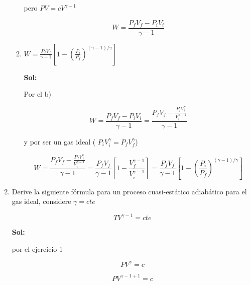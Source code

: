 \documentclass[12pt,a4paper]{article}
\begin{document}
\begin{enumerate}
\begin{enumerate}
        pero $PV = c V^{\gamma - 1}$
        
        \begin{equation*}
            W =  \frac{P_{f} V_{f} - P_{i}V_{i}}{\gamma - 1}
        \end{equation*}
        
        
        \item $W = \frac{P_f V_f}{\gamma - 1}\left[1 - \left(\frac{P_i}{P_f}\right)^{(\gamma - 1)/\gamma}\right]$
        
        \textbf{Sol:}
        
        Por el b)
        
        \begin{equation*}
            W =  \frac{P_{f} V_{f} - P_{i}V_{i}}{\gamma - 1} = \frac{P_{f} V_{f} - \frac{P_{i}V_{i}^{\gamma}}{V_{i}^{\gamma - 1}}}{\gamma - 1} 
        \end{equation*}
        
        y por ser un gas ideal ( $P_i V_{i}^{\gamma} = P_{f} V_{f}^{\gamma}$)
        
        \begin{equation*}
            W =\frac{P_{f} V_{f} - \frac{P_{f}V_{f}^{\gamma}}{V_{i}^{\gamma - 1}}}{\gamma - 1} = \frac{P_f V_f}{\gamma - 1} \left[ 1 - \frac{V_{f}^{\gamma - 1}}{V_{i}^{\gamma - 1}}\right] = \frac{P_f V_f}{\gamma - 1}\left[1 - \left(\frac{P_i}{P_f}\right)^{(\gamma - 1)/\gamma}\right]
        \end{equation*}
        
    \end{enumerate}
    
    
    
    
    
    
    \item Derive la siguiente fórmula para un proceso cuasi-estático adiabático para el gas ideal, considere $\gamma = cte$
    
    \begin{equation*}
        TV^{\gamma -1} = cte
    \end{equation*}
    
    \textbf{Sol:}
    
    por el ejercicio 1
    
    \begin{equation*}
        PV^{\gamma} = c
    \end{equation*}
    
    \begin{equation*}
        PV^{\gamma - 1 + 1} = c
    \end{equation*}
    

\end{enumerate}
\end{document}
